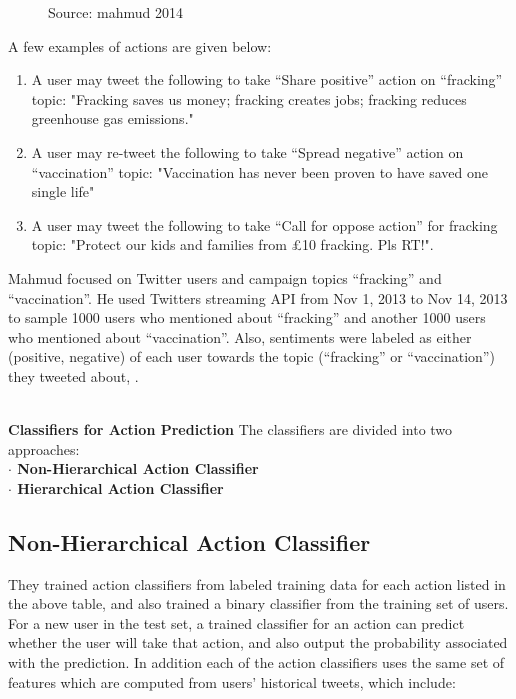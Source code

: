 \begin{figure}[h]
  \centering
  \caption[Action Prediction]%
  {Source: mahmud 2014}
  \label{fig:ALAP:sm1}
\end{figure}


A few examples of actions are given below:
\begin{enumerate}
\item A user may tweet the following to take “Share positive” action on “fracking” topic:
"Fracking saves us money; fracking creates jobs; fracking reduces greenhouse gas
emissions."
\item A user may re-tweet the following to take “Spread negative” action on “vaccination”
topic: "Vaccination has never been proven to have saved one single life"
\item A user may tweet the following to take “Call for oppose action” for fracking topic:
"Protect our kids and families from \pounds10 fracking. Pls RT!".
\end{enumerate}
Mahmud focused on Twitter users and campaign topics “fracking” and “vaccination”. He used
Twitter\textquotesingle s streaming API from Nov 1, 2013 to Nov 14, 2013 to sample 1000 users who mentioned
about “fracking” and another 1000 users who mentioned about “vaccination”. Also, sentiments
were labeled as either (positive, negative) of each user towards the topic (“fracking” or
“vaccination”) they tweeted about, \cite{ref38}.

\leavevmode\\
\textbf{Classifiers for Action Prediction}
The classifiers are divided into two approaches:\\
\textbf{$\cdot$ Non-Hierarchical Action Classifier}\\
\textbf{$\cdot$ Hierarchical Action Classifier}

\subsection{Non-Hierarchical Action Classifier}
They trained action classifiers from labeled training data for each action listed in the above table, 
and also trained a binary classifier from the training set of users.\\
For a new user in the test set, a trained classifier for an action can predict whether the user will
take that action, and also output the probability associated with the prediction. In addition each of the action classifiers uses the same set of features which are computed from users' historical
tweets, which include:\\

